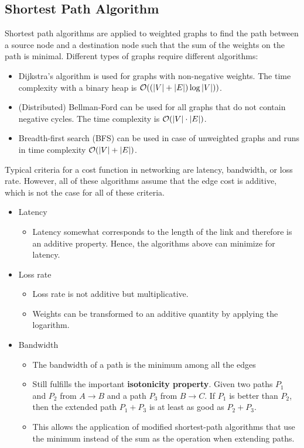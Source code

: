 \subsection{Shortest Path Algorithm} 
Shortest path algorithms are applied to weighted graphs to find the path between a source node and a destination node such that the sum of the weights on the path  is minimal. Different types of graphs require different algorithms:
\begin{itemize}
\item Dijkstra's algorithm is used for graphs with non-negative weights. The time complexity with a binary heap is $\mathcal{O} ((|V| + |E|)\log|
V|))$.
\item (Distributed) Bellman-Ford can be used for all graphs that do not contain negative cycles. The time complexity is $\mathcal{O} (|V| \cdot |E|)$.
\item Breadth-first search (BFS) can be used in case of unweighted graphs and runs in time complexity $\mathcal{O} (|V| + |E|)$.
\end{itemize}
Typical criteria for a cost function in networking are latency, bandwidth, or loss rate. However, all of these algorithms assume that the edge cost is additive, which is not the case for all of these criteria.
\begin{itemize}
\item Latency
\begin{itemize}
\item Latency somewhat corresponds to the length of the link and therefore is an additive property. Hence, the algorithms above can minimize for latency.
\end{itemize}
\item Loss rate
\begin{itemize}
\item Loss rate is not additive but multiplicative.
\item Weights can be transformed to an additive quantity by applying the logarithm.
\end{itemize}
\item Bandwidth
\begin{itemize}
\item The bandwidth of a path is the minimum among all the edges
\item Still fulfills the important \textbf{isotonicity property}. Given two paths $P_1$ and $P_2$ from $A \to B$ and a path $P_3$ from $B \to C$. If $P_1$ is better than $P_2$, then the extended path $P_1 + P_3$ is at least as good as $P_2 + P_3$.
\item This allows the application of modified shortest-path algorithms that use the minimum instead of the sum as the operation when extending paths.
\end{itemize}
\end{itemize}
